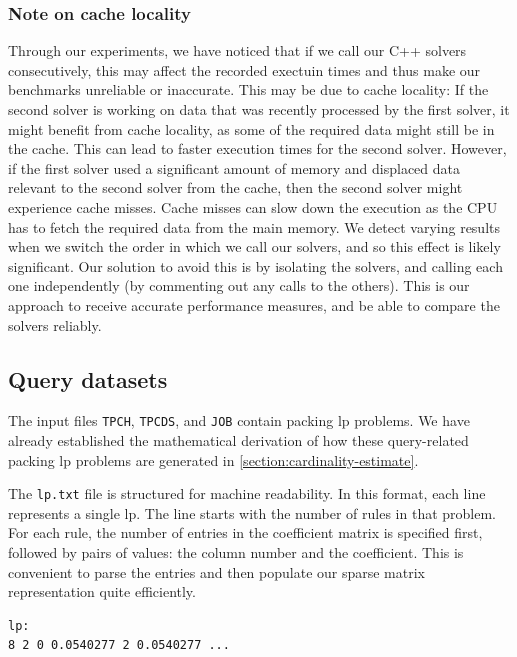 \subsubsection{Note on cache locality}
Through our experiments, we have noticed that if we call our C++ solvers
consecutively, this may affect the recorded exectuin times and thus make our benchmarks
unreliable or inaccurate. This may be due to cache locality: If the second solver is working
on data that was recently processed by the first solver, it might benefit from cache locality,
as some of the required data
might still be in the cache. This can lead to faster execution times for the second solver.
However, if the first solver used a significant amount of memory and displaced data relevant
to the second solver from the cache, then the second solver might experience cache misses.
Cache misses
can slow down the execution as the CPU has to fetch the required data from the main memory.
We detect varying results when we switch the order in which we call our solvers, and so
this effect is likely significant.
Our solution to avoid this is by isolating the solvers, and calling each one independently
(by commenting out any calls to the others). This is our approach to receive
accurate performance measures, and be able to compare the solvers reliably.

\subsection{Query datasets}
The input files \texttt{TPCH}, \texttt{TPCDS}, and \texttt{JOB} contain packing
\gls{lp} problems. We have already established the mathematical derivation of how
these query-related packing
\gls{lp} problems are generated in \ref{section:cardinality-estimate}.

The \texttt{lp.txt} file is structured for machine readability.
In this format, each line represents a single \gls{lp}. The line starts with
the number of rules in that problem. For each rule, the number of entries in
the coefficient matrix is specified first, followed by pairs of values:
the column number and the coefficient. This is convenient to parse the entries
and then populate our sparse matrix representation quite efficiently.

\begin{lstlisting}
lp:
8 2 0 0.0540277 2 0.0540277 ...
\end{lstlisting} \label{format_input}

